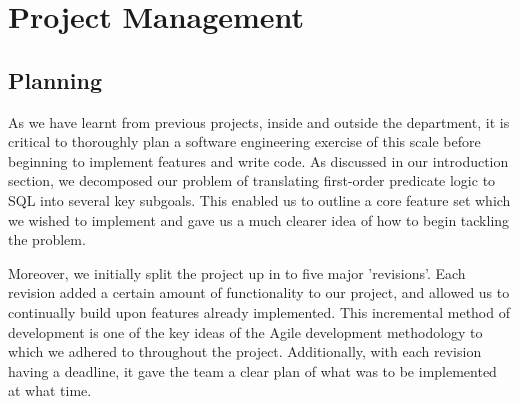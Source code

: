 \documentclass[a4paper, 11pt]{article}
\begin{document}
 

\section{Project Management}
  \subsection{Planning}
    As we have learnt from previous projects, inside and outside the
    department, it is critical to thoroughly plan a software engineering
    exercise of this scale before beginning to implement features and write
    code. As discussed in our introduction section, we decomposed our problem
    of translating first-order predicate logic to SQL into several key
    subgoals. This enabled us to outline a core feature set which we wished to
    implement and gave us a much clearer idea of how to begin tackling the
    problem.

    Moreover, we initially split the project up in to five major 'revisions'.
    Each revision added a certain amount of functionality to our project, and
    allowed us to continually build upon features already implemented. This
    incremental method of development is one of the key ideas of the Agile
    development methodology to which we adhered to throughout the project.
    \cite{agilemanifesto} Additionally, with each revision having a
    deadline, it gave the team a clear plan of what was to be implemented at
    what time.
\end{document}
